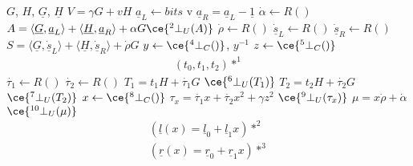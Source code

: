 \newpage
$G$, $H$, $\underline{G}$, $\underline{H}$ \hspace*{\fill}  \newline
$V = \gamma G + v H$ \hspace*{\fill}  \newline
$\underline{a}_L \leftarrow bits$ v \newline
$\underline{a}_R = \underline{a}_L - \underline{1}$ \newline 
$\dot{\alpha} \leftarrow R()$ \newline
$A = \langle\underline{G},\underline{a}_L\rangle + \langle\underline{H},\underline{a}_R\rangle + \alpha G \hspace*{\fill}\ce{^{2}_{\ }\bot_U(A)}$ \newline
$\dot{\rho} \leftarrow R()$ \newline
$\underline{\dot{s}}_L \leftarrow R()$ \newline
$\underline{\dot{s}}_R \leftarrow R()$ \newline
$S = \langle\underline{G},\underline{\dot{s}}_L\rangle + \langle\underline{H},\underline{\dot{s}}_R\rangle + \dot{\rho} G$\hspace*{\fill}  \newline
$y\leftarrow \ce{^{4}_{\ }\bot_C()}$, $y^{-1}$ \newline
$z\leftarrow \ce{^{5}_{\ }\bot_C()}$
\begin{align*}
(t_0, t_1, t_2)*^1
\end{align*}
$\dot{\tau_1} \leftarrow R()$ \newline
$\dot{\tau_2} \leftarrow R()$ \newline
$T_1 = t_1 H + \dot{\tau_1} G $ \hspace*{\fill} $\ce{^{6}_{\ }\bot_U(T_1)}$ \newline
$T_2 = t_2 H + \dot{\tau_2} G $ \hspace*{\fill} $\ce{^{7}_{\ }\bot_U(T_2)}$ \newline
$x\leftarrow \ce{^{8}_{\ }\bot_C()}$ \newline
$\tau_x = \dot{\tau_1}x + \dot{\tau_2}x^2 + \gamma z^2$ \hspace*{\fill}$\ce{^{9}_{\ }\bot_U(\tau_x)}$ \newline
$\mu = x\dot{\rho} + \dot{\alpha}$ \hspace*{\fill}$\ce{^{10}_{\ }\bot_U(\mu)}$ \newline
\begin{align*}
(\underline{l}(x) = \underline{l}_0 + \underline{l}_1 x)*^2\\
(\underline{r}(x) = \underline{r}_0 + \underline{r}_1 x)*^3
\end{align*}
